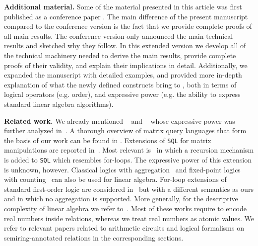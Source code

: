 \smallskip
\noindent
\textbf{Additional material.} 
Some of the material presented in this article was first published as a conference
paper \cite{geerts2020expressive}. The main difference of the present manuscript compared to the conference version is the fact that we provide complete proofs of all main results. The conference version \cite{geerts2020expressive} only announced the main technical results and sketched why they follow. In this extended version we develop all of the technical machinery needed to derive the main results, provide complete proofs of their validity, and explain their implications in detail. Additionally, we expanded the manuscript with detailed examples, and provided more in-depth explanation of what the newly defined constructs bring to \lang, both in terms of logical operators (e.g. order), and expressive power (e.g. the ability to express standard linear algebra algorithms). %





\smallskip
\noindent
\textbf{Related work.} 
We already mentioned \lara~\cite{HutchisonHS17} and \lang~\cite{matlang-journal}
whose expressive power was further analyzed in~\cite{BarceloH0S20,brijder2019matrices,Geerts19,Geerts20}. A thorough overview of matrix query languages that form the basis of our work can be found in \cite{GeertsMRBV21}. Extensions of \texttt{SQL} for matrix manipulations are reported in~\cite{Jermaine/17/LAonRA}. Most relevant
is~\cite{JankovLYCZJG19} in which a recursion mechanism is added to \texttt{SQL} which resembles for-loops.
The expressive power of this extension is unknown, however. Classical logics with aggregation~\cite{Hella:2001} and fixed-point logics with counting~\cite{GroheP17} can also be used for linear algebra. For-loop extensions of  standard first-order logic are considered in~\cite{NevenOTB01} but with a different semantics as ours and in which no aggregation is supported.
More generally, for the descriptive complexity of linear algebra we refer to~\cite{dghl_rank,holm_phd}. Most of these works require to encode real numbers inside relations, whereas we treat real numbers as atomic values. We refer to relevant papers related to arithmetic circuits and logical formalisms on semiring-annotated relations in the corresponding sections.%